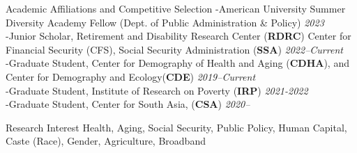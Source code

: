 \documentclass{resume} %
\begin{document}
\begin{rSection}{Academic Affiliations and Competitive Selection}
-American University Summer Diversity Academy Fellow (Dept. of Public Administration \& Policy) \hfill \textit{2023} \\
-Junior Scholar, Retirement and Disability Research Center (\textbf{RDRC}) Center for Financial Security (CFS), Social Security Administration (\textbf{SSA}) 
 \hfill \textit{2022--Current} \\
-Graduate Student, Center for Demography of Health and Aging (\textbf{CDHA}), and Center for Demography and Ecology(\textbf{CDE})
 \hfill \textit{2019--Current}\\
-Graduate Student, Institute of Research on Poverty (\textbf{IRP})%
 \hfill \textit{2021-2022}\\
 -Graduate Student, Center for South Asia, (\textbf{CSA})%
 \hfill \textit{2020--}
\end{rSection}


\begin{rSection}{Research Interest}
Health, Aging, Social Security, Public Policy, Human Capital, Caste (Race), Gender, Agriculture, Broadband
\end{rSection}
\end{document}
